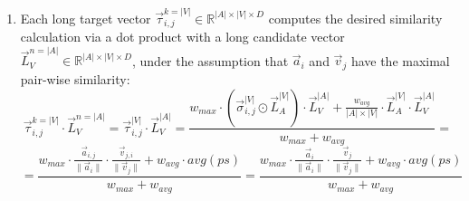 \begin{enumerate}
    \item Each long target vector $\vec{\tau}_{i, j}^{k=|V|} \in \mathbb{R}^{|A| \times |V| \times D}$ computes the desired similarity calculation via a dot product with a long candidate vector $\vec{L}_V^{n=|A|} \in \mathbb{R}^{|A| \times |V| \times D}$, under the assumption that $\vec{a}_i$ and $\vec{v}_j$ have the maximal pair-wise similarity:
    \begin{equation*}
        \vec{\tau}_{i, j}^{k=|V|} \cdot \vec{L}_V^{n=|A|} =
         \vec{\tau}_{i, j}^{|V|} \cdot \vec{L}_V^{|A|} = \frac{w_{max} \cdot (\vec{\sigma}_{i, j}^{|V|} \odot \vec{L}_{A}^{|V|}) \cdot \vec{L}_V^{|A|} + \frac{w_{avg}}{|A| \times |V|} \cdot \vec{L}_{A}^{|V|} \cdot \vec{L}_V^{|A|}}{w_{max} + w_{avg}} 
        = 
    \end{equation*}
    \begin{equation*}
        = 
        \frac{w_{max} \cdot \frac{\vec{a}_{i, j}}{\lVert \vec{a}_i \rVert} \cdot \frac{\vec{v}_{j, i}}{\lVert \vec{v}_j \rVert} + w_{avg} \cdot avg(ps)}{w_{max} + w_{avg}}
        = 
        \frac{w_{max} \cdot \frac{\vec{a}_{i}}{\lVert \vec{a}_i \rVert} \cdot \frac{\vec{v}_{j}}{\lVert \vec{v}_j \rVert} + w_{avg} \cdot avg(ps)}{w_{max} + w_{avg}}
    \end{equation*}

\end{enumerate}

